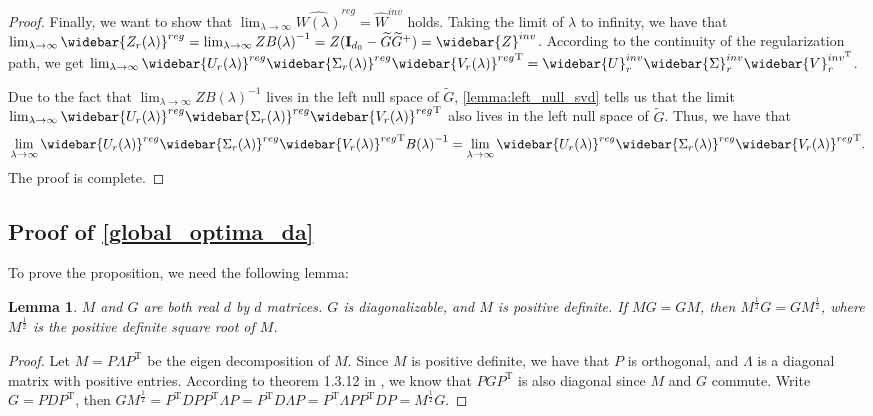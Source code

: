 \documentclass{article}
\newcommand{\T}{\mathrm{T}}
\theoremstyle{plain}
\newtheorem{lemma}[theorem]{Lemma}
\theoremstyle{definition}
\theoremstyle{remark}
\theoremstyle{remark}
\begin{document}
\begin{proof}
      Finally, we want to show that $\lim_{\lambda \rightarrow \infty} \widehat{W(\lambda)}^{reg} =  \widehat{W}^{inv}$ holds. Taking the limit of $\lambda$ to infinity, we have that $\lim_{\lambda \rightarrow \infty} \widebar{Z_r(\lambda)}^{reg} = \lim_{\lambda \rightarrow \infty} Z{B(\lambda)}^{-1} = Z(\mathbf{I}_{d_0}-\widetilde{G}\widetilde{G}^{+}) = \widebar{Z}^{inv}$. According to the continuity of the regularization path, we get $\lim_{\lambda \rightarrow \infty} \widebar{U_r(\lambda)}^{reg} \widebar{\Sigma_r(\lambda)}^{reg} {\widebar{V_r(\lambda)}^{reg}}^{\T} = \widebar{U}^{inv}_r \widebar{\Sigma}^{inv}_r \widebar {V}_{r}^{inv^{\T}}$.

      Due to the fact that $\lim_{\lambda \rightarrow \infty} Z{B(\lambda)}^{-1}$ lives in the left null space of $\widetilde{G}$, \autoref{lemma:left_null_svd} tells us that the limit $\lim_{\lambda \rightarrow \infty} \widebar{U_r(\lambda)}^{reg} \widebar{\Sigma_r(\lambda)}^{reg} {\widebar{V_r(\lambda)}^{reg}}^{\T}$ also lives in the left null space of $\widetilde{G}$. Thus, we have that
      \begin{align}
        \lim_{\lambda \rightarrow \infty} \widebar{U_r(\lambda)}^{reg} \widebar{\Sigma_r(\lambda)}^{reg} {\widebar{V_r(\lambda)}^{reg}}^{\T} {B(\lambda)}^{-1} = \lim_{\lambda \rightarrow \infty} \widebar{U_r(\lambda)}^{reg} \widebar{\Sigma_r(\lambda)}^{reg} {\widebar{V_r(\lambda)}^{reg}}^{\T}.
      \end{align}
      The proof is complete.
    \end{proof}

\subsection{Proof of \autoref{global_optima_da}} \label{app:proof-thm2}
  To prove the proposition, we need the following lemma:
  \begin{lemma} \label{lemma: commute_pd_matrix}
    $M$ and $G$ are both real $d$ by $d$ matrices. $G$ is diagonalizable, and $M$ is positive definite. If $MG = GM$, then $M^{\frac{1}{2}} G = GM^{\frac{1}{2}}$, where $M^{\frac{1}{2}}$ is the positive definite square root of $M$.
  \end{lemma}

  \begin{proof}
    Let $M = P \Lambda P^{\T}$ be the eigen decomposition of $M$. Since $M$ is positive definite, we have that $P$ is orthogonal, and $\Lambda$ is a diagonal matrix with positive entries. According to theorem 1.3.12 in \citet{horn_matrix_2017}, we know that $P G P^{\T}$ is also diagonal since $M$ and $G$ commute. Write $G = P D P^{\T}$, then $GM^{\frac{1}{2}} = P^{\T} D PP^{\T}\Lambda P = P^{\T} D \Lambda P = P^{\T} \Lambda PP^{\T} D P = M^{\frac{1}{2}} G$.
  \end{proof}
\end{document}
